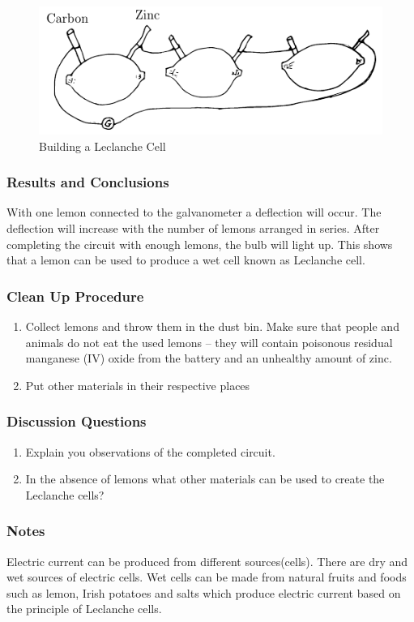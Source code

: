\begin{figure}[h]
\begin{center}
\includegraphics{./img/leclanche-cell.png}
\caption{Building a Leclanche Cell}
\label{fig:leclanche-cell}
\end{center}
\end{figure}

\subsubsection*{Results and Conclusions}
With one lemon connected to the galvanometer a deflection will occur. The deflection will increase with the number of lemons arranged in series. After completing the circuit with enough lemons, the bulb will light up. This shows that a lemon can be used to produce a wet cell known as Leclanche cell.  

\subsubsection*{Clean Up Procedure}
\begin{enumerate}
\item{Collect lemons and throw them in the dust bin. Make sure that people and animals do not eat the used lemons -- they will contain poisonous residual manganese (IV) oxide from the battery and an unhealthy amount of zinc.}
\item{Put other materials in their respective places}
\end{enumerate}

\subsubsection*{Discussion Questions}
\begin{enumerate}
\item{Explain you observations of the completed circuit.}
\item{In the absence of lemons what other materials can be used to create the Leclanche cells?} 
\end{enumerate}

\subsubsection*{Notes}
Electric current can be produced from different sources(cells). There are dry and wet sources of electric cells. Wet cells can be made from natural fruits and foods such as lemon, Irish potatoes and salts which produce electric current based on the principle of Leclanche cells.

